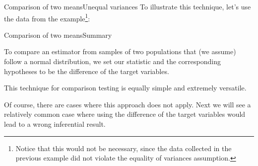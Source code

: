 \begin{frame}[fragile]{Comparison of two means}{Unequal variances}
To illustrate this technique, let's use the data from the example\footnote[2]{Notice that this would not be necessary, since the data collected in the previous example did not violate the equality of variances assumption.}:
\bigskip

{}
\end{frame}

%
%

\begin{frame}{Comparison of two means}{Summary}

  To compare an estimator from samples of two populations that (we assume) follow a normal distribution, we set our statistic and the corresponding hypotheses to be the difference of the target variables.\bigskip

  This technique for comparison testing is equally simple and extremely versatile.\bigskip

  Of course, there are cases where this approach does not apply. Next we will see a relatively common case where using the difference of the target variables would lead to a wrong inferential result.
\end{frame}
